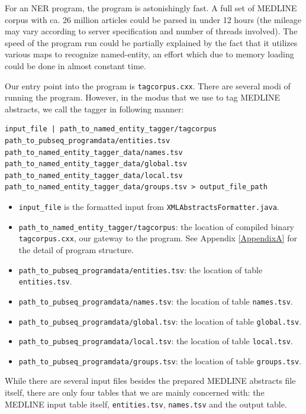 For an NER program, the program is astonishingly fast. A full set of MEDLINE corpus with ca. 26 million articles could be parsed in under 12 hours (the mileage may vary according to server specification and number of threads involved). The speed of the program run could be partially explained by the fact that it utilizes various maps to recognize named-entity, an effort which due to memory loading could be done in almost constant time.

Our entry point into the program is \texttt{tagcorpus.cxx}. There are several modi of running the program. However, in the modus that we use to tag MEDLINE abstracts, we call the tagger in following manner:


\begin{lstlisting}[breaklines]
input_file | path_to_named_entity_tagger/tagcorpus path_to_pubseq_programdata/entities.tsv path_to_named_entity_tagger_data/names.tsv path_to_named_entity_tagger_data/global.tsv path_to_named_entity_tagger_data/local.tsv path_to_named_entity_tagger_data/groups.tsv > output_file_path
\end{lstlisting}

\begin{itemize}
\item \texttt{input\_file} is the formatted input from \texttt{XMLAbstractsFormatter.java}.
\item \texttt{path\_to\_named\_entity\_tagger/tagcorpus}: the location of compiled binary \texttt{tagcorpus.cxx}, our gateway to the program. See Appendix \ref{AppendixA} for the detail of program structure.
\item \texttt{path\_to\_pubseq\_programdata/entities.tsv}: the location of table \texttt{entities.tsv}.
\item \texttt{path\_to\_pubseq\_programdata/names.tsv}: the location of table \texttt{names.tsv}.
\item \texttt{path\_to\_pubseq\_programdata/global.tsv}: the location of table \texttt{global.tsv}.
\item \texttt{path\_to\_pubseq\_programdata/local.tsv}: the location of table \texttt{local.tsv}.
\item \texttt{path\_to\_pubseq\_programdata/groups.tsv}: the location of table \texttt{groups.tsv}.
\end{itemize}

While there are several input files besides the prepared MEDLINE abstracts file itself, there are only four tables that we are mainly concerned with: the MEDLINE input table itself, \texttt{entities.tsv}, \texttt{names.tsv} and the output table.

